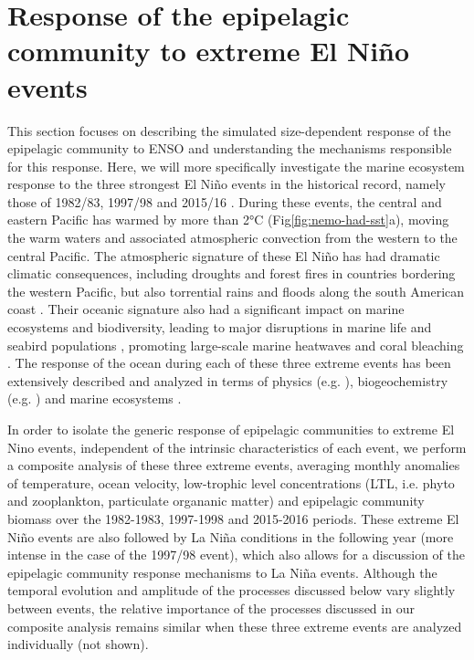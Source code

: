 \section{Response of the epipelagic community to extreme El Niño events}
\label{sec:nino-epi}

This section focuses on describing the simulated size-dependent response of the epipelagic community to ENSO and understanding the mechanisms responsible for this response. Here, we will more specifically investigate the marine ecosystem response to the three strongest El Niño events in the historical record, namely those of 1982/83, 1997/98 and 2015/16 \citep{santosoDefiningCharacteristicsENSO2017}. During these events, the central and eastern Pacific has warmed by more than 2°C (Fig\ref{fig:nemo-had-sst}a), moving the warm waters and associated atmospheric convection from the western to the central Pacific. The atmospheric signature of these El Niño has had dramatic climatic consequences, including droughts and forest fires in countries bordering the western Pacific, but also torrential rains and floods along the south American coast \citep{caiClimateImpactsNino2020}. Their oceanic signature also had a significant impact on marine ecosystems and biodiversity, leading to major disruptions in marine life and seabird populations \citep{valleImpact198219831987}, promoting large-scale marine heatwaves \citep{holbrookKeepingPaceMarine2020} and coral bleaching \citep{claarGlobalPatternsImpacts2018}.  The response of the ocean during each of these three extreme events has been extensively described and analyzed in terms of physics (e.g. \citealp{philanderChapter33Simulation1985, lengaigneOceanResponseMarch2002, puyModulationEquatorialPacific2019}), biogeochemistry (e.g. \citealp{barberBiologicalConsequencesNino1983, chavezBiologicalChemicalResponse1999, strammaObservedNinoConditions2016}) and marine ecosystems \citep{glynnNINOSOUTHERNOSCILLATION198219831988, glynnCoralBleachingMortality2001, eakin20142017Globalscale2019}. 

In order to isolate the generic response of epipelagic communities to extreme El Nino events, independent of the intrinsic characteristics of each event, we perform a composite analysis of these three extreme events, averaging monthly anomalies of temperature, ocean velocity, low-trophic level concentrations (LTL, i.e. phyto and zooplankton, particulate organanic matter) and epipelagic community biomass over the 1982-1983, 1997-1998 and 2015-2016 periods. These extreme El Niño events are also followed by La Niña conditions in the following year (more intense in the case of the 1997/98 event), which also allows for a discussion  of the epipelagic community response mechanisms to La Niña events. Although the temporal evolution and amplitude of the processes discussed below vary slightly between events, the relative importance of the processes discussed in our composite analysis remains similar when these three extreme events are analyzed individually (not shown). 

